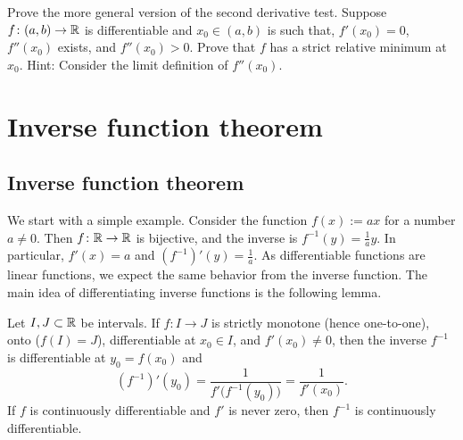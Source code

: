 \begin{exercise}
Prove the more general version of the second derivative test.
Suppose $f \colon (a,b) \to {\mathbb{R}}$ is differentiable and $x_0 \in (a,b)$
is such that, $f'(x_0) = 0$, $f''(x_0)$ exists, and $f''(x_0) > 0$.
Prove that $f$ has a strict relative
minimum at $x_0$.  Hint: Consider the limit definition of $f''(x_0)$.
\end{exercise}


\sectionnewpage
\section{Inverse function theorem}
\label{sec:ift}


\subsection{Inverse function theorem}

We start with a simple example.  Consider the function $f(x) := a x$ for a
number $a \not= 0$.  Then $f \colon {\mathbb{R}} \to {\mathbb{R}}$ is bijective, and the inverse
is $f^{-1}(y) = \frac{1}{a} y$.  In particular, $f'(x) = a$ and 
$(f^{-1})'(y) = \frac{1}{a}$.  As differentiable functions are
 linear functions, we expect the same
behavior from the inverse function.
The main idea of differentiating inverse functions is the following lemma.

\begin{lemma} \label{lemma:ift}
Let $I,J \subset {\mathbb{R}}$ be intervals.
If $f \colon I \to J$ is strictly monotone (hence one-to-one),
onto ($f(I) = J$),
differentiable at $x_0 \in I$, and $f'(x_0) \not= 0$,
then the inverse 
$f^{-1}$ is differentiable at $y_0 = f(x_0)$ and
\begin{equation*}
(f^{-1})'(y_0) = \frac{1}{f'\bigl( f^{-1}(y_0) \bigr)} = \frac{1}{f'(x_0)} .
\end{equation*}
If $f$ is continuously differentiable and $f'$ is never zero, then $f^{-1}$
is continuously differentiable.
\end{lemma}

